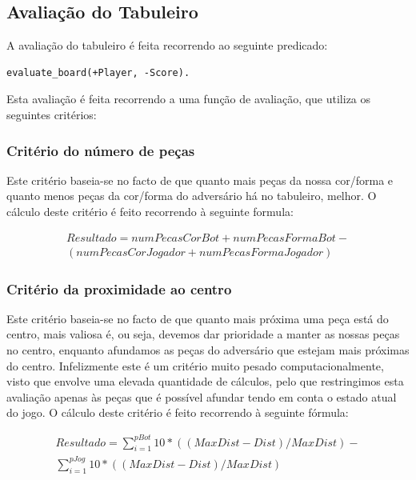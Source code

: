 \documentclass[a4paper]{article}
\begin{document}
\subsection{Avaliação do Tabuleiro}
\label{boardeval}
A avaliação do tabuleiro é feita recorrendo ao seguinte predicado:

\begin{lstlisting}
evaluate_board(+Player, -Score).
\end{lstlisting}

Esta avaliação é feita recorrendo a uma função de avaliação, que utiliza os seguintes critérios:

\subsubsection{Critério do número de peças}

Este critério baseia-se no facto de que quanto mais peças da nossa cor/forma e quanto menos peças da cor/forma do adversário há no tabuleiro, melhor. O cálculo deste critério é feito recorrendo à seguinte formula:

\begin{equation*}
\begin{multlined}
Resultado = numPecasCorBot + numPecasFormaBot - \\
(numPecasCorJogador + numPecasFormaJogador)
\end{multlined}
\end{equation*}

\subsubsection{Critério da proximidade ao centro}

Este critério baseia-se no facto de que quanto mais próxima uma peça está do centro, mais valiosa é, ou seja, devemos dar prioridade a manter as nossas peças no centro, enquanto afundamos as peças do adversário que estejam mais próximas do centro. Infelizmente este é um critério muito pesado computacionalmente, visto que envolve uma elevada quantidade de cálculos, pelo que restringimos esta avaliação apenas às peças que é possível afundar tendo em conta o estado atual do jogo. O cálculo deste critério é feito recorrendo à seguinte fórmula:

\begin{equation*}
\begin{multlined}
Resultado = \sum\limits_{i=1}^{pBot} 10 * ((MaxDist - Dist) / MaxDist) - \\\sum\limits_{i=1}^{pJog} 10 * ((MaxDist - Dist) / MaxDist)
\end{multlined}
\end{equation*}
\end{document}
